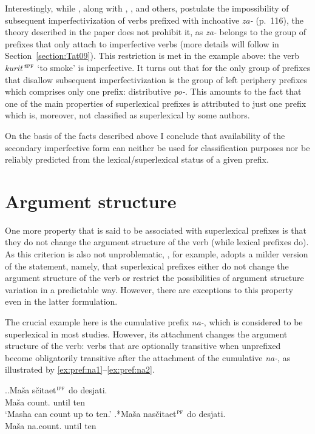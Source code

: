 Interestingly, while \citet{Tatevosov:09}, along with \citet{Svenonius:04b}, \citet{Ramchand:04}, and others, postulate the impossibility of subsequent imperfectivization of verbs prefixed with inchoative \textit{za-} (p.~116), the theory described in the paper does not prohibit it, as \textit{za-} belongs to the group of prefixes that only attach to imperfective verbs (more details will follow in Section~\ref{section:Tat09}). This restriction is met in the example above: the verb \textit{kurit'}$^{\textsc{ipf}}$ `to smoke' is imperfective. It turns out that for \citet{Tatevosov:09} the only group of prefixes that disallow subsequent imperfectivization is the group of left periphery prefixes which comprises only one prefix: distributive \textit{po-}. This amounts to the fact that one of the main properties of superlexical prefixes is attributed to just one prefix which is, moreover, not classified as superlexical by some authors.

On the basis of the facts described above I conclude that availability of the secondary imperfective form can neither be used for classification purposes nor be reliably predicted from the lexical/superlexical status of a given prefix.

\section{Argument structure}\label{section:new:argstructure}
One more property that is said to be associated with superlexical prefixes is that they do not change the argument structure of the verb (while lexical prefixes do). As this criterion is also not unproblematic, \citet[116]{Tatevosov:09}, for example, adopts a milder version of the statement, namely, that superlexical prefixes either do not change the argument structure of the verb or restrict the possibilities of argument structure variation in a predictable way. However, there are exceptions to this property even in the latter formulation. 

The crucial example here is the cumulative prefix \textit{na-}, which is considered to be superlexical in most studies. However, its attachment changes the argument structure of the verb: verbs that are optionally transitive when unprefixed become obligatorily transitive after the attachment of the cumulative \textit{na-}, as illustrated by \ref{ex:pref:na1}--\ref{ex:pref:na2}.

\ex.\label{ex:pref:na1}\ag.\label{ex:pref:na1a}Ma\v{s}a s\v{c}itaet$^{\textsc{ipf}}$ do desjati.\\
Ma\v{s}a count. until ten\\
\trans `Masha can count up to ten.'
\bg.*Ma\v{s}a nas\v{c}itaet$^{\textsc{pf}}$ do desjati.\label{ex:pref:na1b}\\
Ma\v{s}a na.count. until ten\\

